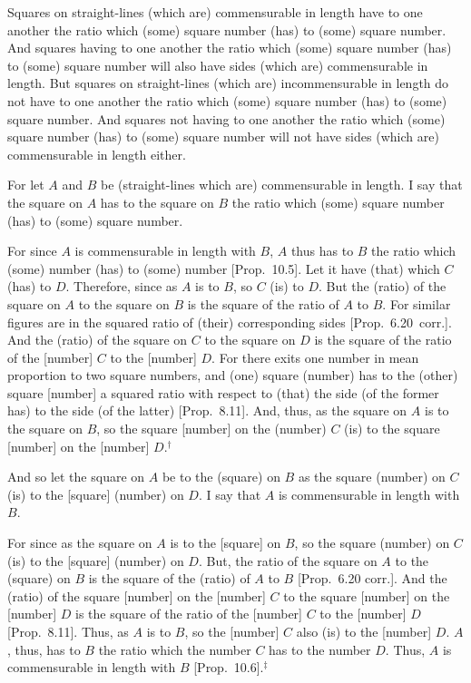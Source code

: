 \begin{Parallel}{}{}
{Squares on straight-lines (which are) commensurable in length have to one another the ratio which (some) square number (has) to (some)
square number. And squares having to one another the ratio which (some)
square number (has) to (some) square number will also have sides (which are)
commensurable in length. But squares on straight-lines (which are) incommensurable
in length do not have to one another the ratio which (some) square
number (has) to (some) square number. And squares not having
to one another the ratio which (some) square number (has) to (some)
square number will not have sides (which are) commensurable in length either.

\epsfysize=0.5in
\centerline{}

For let $A$ and $B$ be (straight-lines which are) commensurable in length.
I say that the square on $A$ has to the square on $B$ the ratio
which (some) square number (has) to (some) square number.

For since $A$ is commensurable in length with $B$, $A$ thus
has to $B$ the ratio which (some) number (has) to (some) number [Prop.~10.5]. Let it have (that) which $C$ (has) to $D$.
Therefore, since as $A$ is to $B$, so $C$ (is) to $D$. But the (ratio)
of the square on $A$ to the square on $B$ is the square of the
ratio of $A$ to $B$. For similar figures are in the squared ratio of (their) corresponding sides [Prop.~6.20~corr.].
And the (ratio) of the square on $C$ to the square on $D$ is the
square of the ratio of the [number] $C$ to the [number] $D$.
For there exits one number in mean proportion to two square numbers,
and (one) square (number) has to the (other) square [number] a squared ratio
with respect to (that) the side (of the former has) to the side (of the latter)
[Prop.~8.11]. And, thus,  as the square on $A$
is to the square on $B$, so the square  [number] on the (number) $C$ (is) to
the square [number] on the [number] $D$.$^\dag$

And so let the square on $A$ be to the (square) on $B$ as the
square (number) on $C$ (is) to the [square] (number) on $D$. I say
that $A$ is commensurable in length  with $B$.

For since as the square on $A$ is to the [square] on $B$, so the
square (number) on $C$ (is) to the [square] (number) on $D$. But,
the ratio of the square on $A$ to the (square) on $B$ is the square
of the (ratio) of $A$ to $B$ [Prop.~6.20 corr.].
And the (ratio) of the square [number] on the [number] $C$ to
the square [number] on the [number] $D$ is the square of the ratio
of the [number] $C$ to the [number] $D$ [Prop.~8.11].  Thus, as $A$ is to $B$, so the
[number] $C$ also (is) to the [number] $D$.
$A$, thus,  has to $B$ the ratio
which the number $C$ has to the number $D$. Thus, $A$ is
commensurable in length with $B$ [Prop.~10.6].$^\ddag$

}
\end{Parallel}
